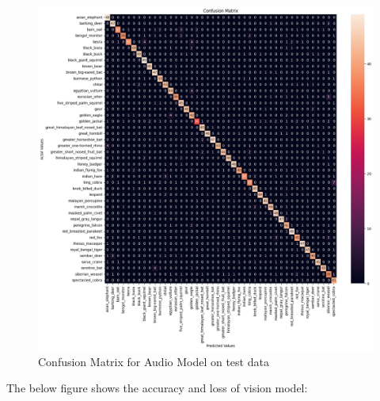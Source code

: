 \documentclass[fleqn, 10pt, twoside]{IOEGC}
\begin{document}
\begin{figure}[h]
	\centering
	\includegraphics[scale=0.5]{Graphics/vision_cm.png}

	\caption{Confusion Matrix for Audio Model on test data}

	\label{fig:enter-label}
\end{figure}


\clearpage
The below figure shows the accuracy and loss of vision model:
\end{document}
